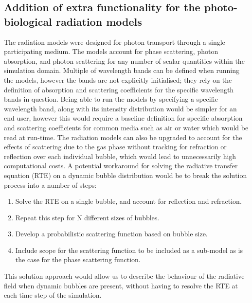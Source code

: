 \subsection{Addition of extra functionality for the photo-biological radiation models}
The radiation models were designed for photon transport through a single participating medium. The models account for phase scattering, photon absorption, and photon scattering for any number of scalar quantities within the simulation domain. Multiple of wavelength bands can be defined when running the models, however the bands are not explicitly initialised; they rely on the definition of absorption and scattering coefficients for the specific wavelength bands in question. Being able to run the models by specifying a specific wavelength band, along with its intensity distribution would be simpler for an end user, however this would require a baseline definition for specific absorption and scattering coefficients for common media such as air or water which would be read at run-time. 
\skippingparagraph
The radiation models can also be upgraded to account for the effects of scattering due to the gas phase without tracking for refraction or reflection over each individual bubble, which would lead to unnecessarily high computational costs. A potential workaround for solving the radiative transfer equation (RTE) on a dynamic bubble distribution would be to break the solution process into a number of steps:
\begin{enumerate}
    \item Solve the RTE on a single bubble, and account for reflection and refraction.
    \item Repeat this step for N different sizes of bubbles.
    \item Develop a probabilistic scattering function based on bubble size.
    \item Include scope for the scattering function to be included as a sub-model as is the case for the phase scattering function. 
\end{enumerate}
This solution approach would allow us to describe the behaviour of the radiative field when dynamic bubbles are present, without having to resolve the RTE at each time step of the simulation.
\skippingparagraph



